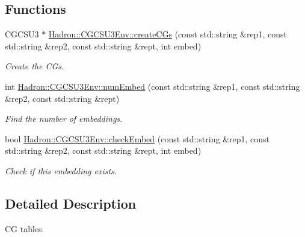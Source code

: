 \subsection*{Functions}
\begin{DoxyCompactItemize}
\item 
C\+G\+C\+S\+U3 $\ast$ \mbox{\hyperlink{namespaceHadron_1_1CGCSU3Env_aa351bf5350216c70336911a96182d035}{Hadron\+::\+C\+G\+C\+S\+U3\+Env\+::create\+C\+Gs}} (const std\+::string \&rep1, const std\+::string \&rep2, const std\+::string \&rept, int embed)
\begin{DoxyCompactList}\small\item\em Create the C\+Gs. \end{DoxyCompactList}\item 
int \mbox{\hyperlink{namespaceHadron_1_1CGCSU3Env_acc35e8f63cd5a1ffe14a963df3f2c1fd}{Hadron\+::\+C\+G\+C\+S\+U3\+Env\+::num\+Embed}} (const std\+::string \&rep1, const std\+::string \&rep2, const std\+::string \&rept)
\begin{DoxyCompactList}\small\item\em Find the number of embeddings. \end{DoxyCompactList}\item 
bool \mbox{\hyperlink{namespaceHadron_1_1CGCSU3Env_a27b5d0906a9a8d201a8479db853e5ca5}{Hadron\+::\+C\+G\+C\+S\+U3\+Env\+::check\+Embed}} (const std\+::string \&rep1, const std\+::string \&rep2, const std\+::string \&rept, int embed)
\begin{DoxyCompactList}\small\item\em Check if this embedding exists. \end{DoxyCompactList}\end{DoxyCompactItemize}


\subsection{Detailed Description}
CG tables. 

